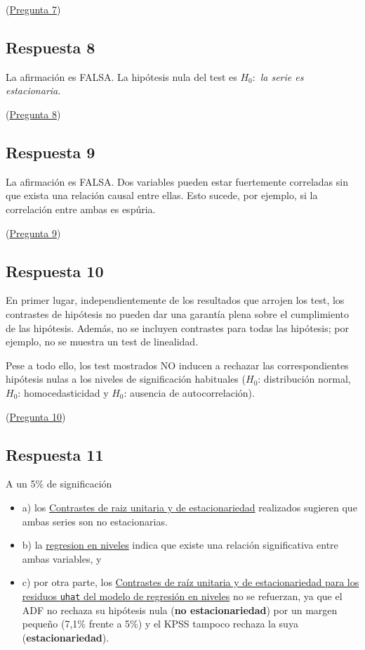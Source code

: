 \documentclass[10pt]{article}
\begin{document}
(\hyperref[sec:orga095046]{Pregunta 7})
\subsection*{Respuesta 8}
\label{sec:org5ba66d1}

La afirmación es FALSA. La hipótesis nula del test es \(H_0:\) \emph{la serie es estacionaria}.

(\hyperref[sec:org4dca258]{Pregunta 8})
\subsection*{Respuesta 9}
\label{sec:org66ff6be}

La afirmación es FALSA. Dos variables pueden estar fuertemente correladas sin que exista una relación causal entre ellas. Esto sucede, por ejemplo, si la correlación entre ambas es espúria.

(\hyperref[sec:org5b2514e]{Pregunta 9})
\subsection*{Respuesta 10}
\label{sec:org0e46c64}

En primer lugar, independientemente de los resultados que arrojen los test, los contrastes de hipótesis no pueden dar una garantía plena sobre el cumplimiento de las hipótesis. Además, no se incluyen contrastes para todas las hipótesis; por ejemplo, no se muestra un test de linealidad.

Pese a todo ello, los test mostrados NO inducen a rechazar las
correspondientes hipótesis nulas a los niveles de significación habituales (\(H_0\): distribución normal, \(H_0\): homocedasticidad y \(H_0\): ausencia de autocorrelación).

(\hyperref[sec:orge41fde9]{Pregunta 10})
\subsection*{Respuesta 11}
\label{sec:org31c0c21}

A un 5\% de significación 
\begin{itemize}
\item a) los \hyperref[sec:org3ac1b04]{Contrastes de raiz unitaria y de estacionariedad} realizados sugieren que ambas series son no estacionarias.
\item b) la \hyperref[sec:org1a45e1f]{regresion en niveles} indica que existe una relación significativa entre ambas variables, y
\item c) por otra parte, los \hyperref[sec:org2512beb]{Contrastes de raíz unitaria y de estacionariedad para los residuos \texttt{uhat} del modelo de regresión en niveles} no se refuerzan, ya que el ADF no rechaza su hipótesis nula (\textbf{no estacionariedad}) por un margen pequeño (7,1\% frente a 5\%) y el KPSS tampoco rechaza la suya (\textbf{estacionariedad}).
\end{itemize}
\end{document}
